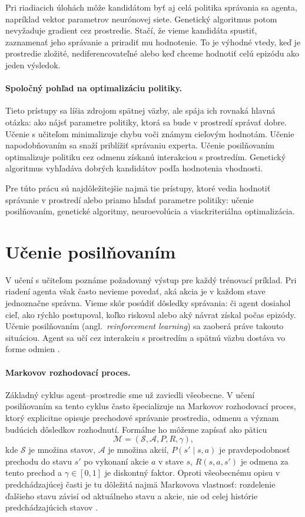 Pri riadiacich úlohách môže kandidátom byť aj celá politika správania sa agenta, napríklad vektor parametrov neurónovej siete. Genetický algoritmus potom nevyžaduje gradient cez prostredie. Stačí, že vieme kandidáta spustiť, zaznamenať jeho správanie a priradiť mu hodnotenie. To je výhodné vtedy, keď je prostredie zložité, nediferencovateľné alebo keď chceme hodnotiť celú epizódu ako jeden výsledok.

\paragraph{Spoločný pohľad na optimalizáciu politiky.}
Tieto prístupy sa líšia zdrojom spätnej väzby, ale spája ich rovnaká hlavná otázka: ako nájsť parametre politiky, ktorá sa bude v prostredí správať dobre. Učenie s učiteľom minimalizuje chybu voči známym cieľovým hodnotám. Učenie napodobňovaním sa snaží priblížiť správaniu experta. Učenie posilňovaním optimalizuje politiku cez odmenu získanú interakciou s prostredím. Genetický algoritmus vyhľadáva dobrých kandidátov podľa hodnotenia vhodnosti.

Pre túto prácu sú najdôležitejšie najmä tie prístupy, ktoré vedia hodnotiť správanie v prostredí alebo priamo hľadať parametre politiky: učenie posilňovaním, genetické algoritmy, neuroevolúcia a viackriteriálna optimalizácia.

\section{Učenie posilňovaním}

V učení s učiteľom poznáme požadovaný výstup pre každý trénovací príklad. Pri riadení agenta však často nevieme povedať, aká akcia je v každom stave jednoznačne správna. Vieme skôr posúdiť dôsledky správania: či agent dosiahol cieľ, ako rýchlo postupoval, koľko riskoval alebo aký návrat získal počas epizódy. Učenie posilňovaním (angl.~\emph{reinforcement learning}) sa zaoberá práve takouto situáciou. Agent sa učí cez interakciu s prostredím a spätnú väzbu dostáva vo forme odmien \cite{sutton_barto2018rl}.

\paragraph{Markovov rozhodovací proces.}
Základný cyklus agent--prostredie sme už zaviedli všeobecne. V učení posilňovaním sa tento cyklus často špecializuje na Markovov rozhodovací proces, ktorý explicitne opisuje prechodové správanie prostredia, odmenu a význam budúcich dôsledkov rozhodnutí. Formálne ho môžeme zapísať ako päticu
\[
    \mathcal{M} = (\mathcal{S}, \mathcal{A}, P, R, \gamma),
\]
kde $\mathcal{S}$ je množina stavov, $\mathcal{A}$ je množina akcií, $P(s' \mid s,a)$ je pravdepodobnosť prechodu do stavu $s'$ po vykonaní akcie $a$ v stave $s$, $R(s,a,s')$ je odmena za tento prechod a $\gamma \in [0,1]$ je diskontný faktor. Oproti všeobecnému opisu v predchádzajúcej časti je tu dôležitá najmä Markovova vlastnosť: rozdelenie ďalšieho stavu závisí od aktuálneho stavu a akcie, nie od celej histórie predchádzajúcich stavov \cite{sutton_barto2018rl}.


